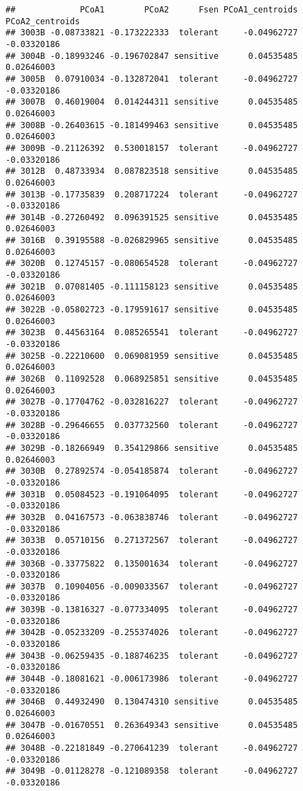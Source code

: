 \documentclass[
]{article}
\begin{document}
\begin{verbatim}
##             PCoA1        PCoA2      Fsen PCoA1_centroids PCoA2_centroids
## 3003B -0.08733821 -0.173222333  tolerant     -0.04962727     -0.03320186
## 3004B -0.18993246 -0.196702847 sensitive      0.04535485      0.02646003
## 3005B  0.07910034 -0.132872041  tolerant     -0.04962727     -0.03320186
## 3007B  0.46019004  0.014244311 sensitive      0.04535485      0.02646003
## 3008B -0.26403615 -0.181499463 sensitive      0.04535485      0.02646003
## 3009B -0.21126392  0.530018157  tolerant     -0.04962727     -0.03320186
## 3012B  0.48733934  0.087823518 sensitive      0.04535485      0.02646003
## 3013B -0.17735839  0.208717224  tolerant     -0.04962727     -0.03320186
## 3014B -0.27260492  0.096391525 sensitive      0.04535485      0.02646003
## 3016B  0.39195588 -0.026829965 sensitive      0.04535485      0.02646003
## 3020B  0.12745157 -0.080654528  tolerant     -0.04962727     -0.03320186
## 3021B  0.07081405 -0.111158123 sensitive      0.04535485      0.02646003
## 3022B -0.05802723 -0.179591617 sensitive      0.04535485      0.02646003
## 3023B  0.44563164  0.085265541  tolerant     -0.04962727     -0.03320186
## 3025B -0.22210600  0.069081959 sensitive      0.04535485      0.02646003
## 3026B  0.11092528  0.068925851 sensitive      0.04535485      0.02646003
## 3027B -0.17704762 -0.032816227  tolerant     -0.04962727     -0.03320186
## 3028B -0.29646655  0.037732560  tolerant     -0.04962727     -0.03320186
## 3029B -0.18266949  0.354129866 sensitive      0.04535485      0.02646003
## 3030B  0.27892574 -0.054185874  tolerant     -0.04962727     -0.03320186
## 3031B  0.05084523 -0.191064095  tolerant     -0.04962727     -0.03320186
## 3032B  0.04167573 -0.063838746  tolerant     -0.04962727     -0.03320186
## 3033B  0.05710156  0.271372567  tolerant     -0.04962727     -0.03320186
## 3036B -0.33775822  0.135001634  tolerant     -0.04962727     -0.03320186
## 3037B  0.10904056 -0.009033567  tolerant     -0.04962727     -0.03320186
## 3039B -0.13816327 -0.077334095  tolerant     -0.04962727     -0.03320186
## 3042B -0.05233209 -0.255374026  tolerant     -0.04962727     -0.03320186
## 3043B -0.06259435 -0.188746235  tolerant     -0.04962727     -0.03320186
## 3044B -0.18081621 -0.006173986  tolerant     -0.04962727     -0.03320186
## 3046B  0.44932490  0.130474310 sensitive      0.04535485      0.02646003
## 3047B -0.01670551  0.263649343 sensitive      0.04535485      0.02646003
## 3048B -0.22181849 -0.270641239  tolerant     -0.04962727     -0.03320186
## 3049B -0.01128278 -0.121089358  tolerant     -0.04962727     -0.03320186
\end{verbatim}
\end{document}

